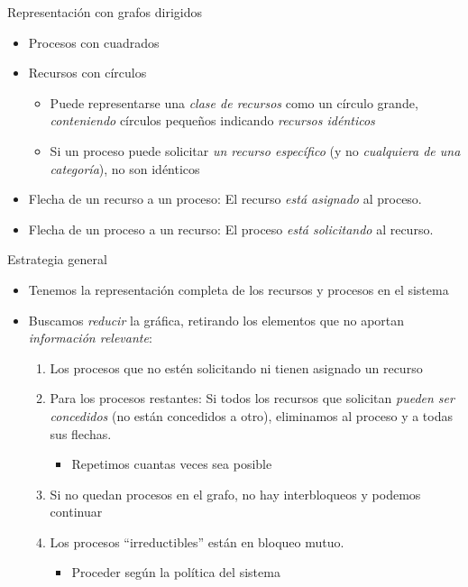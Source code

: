 \documentclass[presentation]{beamer}
\begin{document}
\begin{frame}[label={sec:orgb62b46f}]{Representación con grafos dirigidos}
\begin{itemize}
\item Procesos con cuadrados
\item Recursos con círculos
\begin{itemize}
\item Puede representarse una \emph{clase de recursos} como un círculo
grande, \emph{conteniendo} círculos pequeños indicando \emph{recursos
idénticos}
\item Si un proceso puede solicitar \emph{un recurso específico} (y no
\emph{cualquiera de una categoría}), no son idénticos
\end{itemize}
\item Flecha de un recurso a un proceso: El recurso \emph{está asignado} al
proceso.
\item Flecha de un proceso a un recurso: El proceso \emph{está solicitando} al
recurso.
\end{itemize}
\end{frame}

\begin{frame}[label={sec:org07da955}]{Estrategia general}
\begin{itemize}
\item Tenemos la representación completa de los recursos y procesos en el
sistema
\item Buscamos \emph{reducir} la gráfica, retirando los elementos que no
aportan \emph{información relevante}:
\begin{enumerate}
\item Los procesos que no estén solicitando ni tienen asignado un
recurso
\item Para los procesos restantes: Si todos los recursos que solicitan
\emph{pueden ser concedidos} (no están concedidos a otro), eliminamos
al proceso y a todas sus flechas.
\begin{itemize}
\item Repetimos cuantas veces sea posible
\end{itemize}
\item Si no quedan procesos en el grafo, no hay interbloqueos y podemos
continuar
\item Los procesos ``irreductibles'' están en bloqueo mutuo.
\begin{itemize}
\item Proceder según la política del sistema
\end{itemize}
\end{enumerate}
\end{itemize}
\end{frame}
\end{document}
